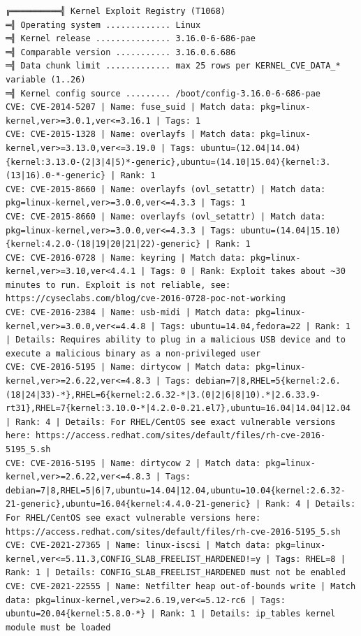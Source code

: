 \documentclass[letterpaper,11pt]{article}
\begin{document}
\begin{lstlisting}[style=salidaLinpeas]
╔══════════╣ Kernel Exploit Registry (T1068)
═╣ Operating system ............. Linux
═╣ Kernel release ............... 3.16.0-6-686-pae
═╣ Comparable version ........... 3.16.0.6.686
═╣ Data chunk limit ............. max 25 rows per KERNEL_CVE_DATA_* variable (1..26)
═╣ Kernel config source ......... /boot/config-3.16.0-6-686-pae
CVE: CVE-2014-5207 | Name: fuse_suid | Match data: pkg=linux-kernel,ver>=3.0.1,ver<=3.16.1 | Tags: 1
CVE: CVE-2015-1328 | Name: overlayfs | Match data: pkg=linux-kernel,ver>=3.13.0,ver<=3.19.0 | Tags: ubuntu=(12.04|14.04){kernel:3.13.0-(2|3|4|5)*-generic},ubuntu=(14.10|15.04){kernel:3.(13|16).0-*-generic} | Rank: 1
CVE: CVE-2015-8660 | Name: overlayfs (ovl_setattr) | Match data: pkg=linux-kernel,ver>=3.0.0,ver<=4.3.3 | Tags: 1
CVE: CVE-2015-8660 | Name: overlayfs (ovl_setattr) | Match data: pkg=linux-kernel,ver>=3.0.0,ver<=4.3.3 | Tags: ubuntu=(14.04|15.10){kernel:4.2.0-(18|19|20|21|22)-generic} | Rank: 1
CVE: CVE-2016-0728 | Name: keyring | Match data: pkg=linux-kernel,ver>=3.10,ver<4.4.1 | Tags: 0 | Rank: Exploit takes about ~30 minutes to run. Exploit is not reliable, see: https://cyseclabs.com/blog/cve-2016-0728-poc-not-working
CVE: CVE-2016-2384 | Name: usb-midi | Match data: pkg=linux-kernel,ver>=3.0.0,ver<=4.4.8 | Tags: ubuntu=14.04,fedora=22 | Rank: 1 | Details: Requires ability to plug in a malicious USB device and to execute a malicious binary as a non-privileged user
CVE: CVE-2016-5195 | Name: dirtycow | Match data: pkg=linux-kernel,ver>=2.6.22,ver<=4.8.3 | Tags: debian=7|8,RHEL=5{kernel:2.6.(18|24|33)-*},RHEL=6{kernel:2.6.32-*|3.(0|2|6|8|10).*|2.6.33.9-rt31},RHEL=7{kernel:3.10.0-*|4.2.0-0.21.el7},ubuntu=16.04|14.04|12.04 | Rank: 4 | Details: For RHEL/CentOS see exact vulnerable versions here: https://access.redhat.com/sites/default/files/rh-cve-2016-5195_5.sh
CVE: CVE-2016-5195 | Name: dirtycow 2 | Match data: pkg=linux-kernel,ver>=2.6.22,ver<=4.8.3 | Tags: debian=7|8,RHEL=5|6|7,ubuntu=14.04|12.04,ubuntu=10.04{kernel:2.6.32-21-generic},ubuntu=16.04{kernel:4.4.0-21-generic} | Rank: 4 | Details: For RHEL/CentOS see exact vulnerable versions here: https://access.redhat.com/sites/default/files/rh-cve-2016-5195_5.sh
CVE: CVE-2021-27365 | Name: linux-iscsi | Match data: pkg=linux-kernel,ver<=5.11.3,CONFIG_SLAB_FREELIST_HARDENED!=y | Tags: RHEL=8 | Rank: 1 | Details: CONFIG_SLAB_FREELIST_HARDENED must not be enabled
CVE: CVE-2021-22555 | Name: Netfilter heap out-of-bounds write | Match data: pkg=linux-kernel,ver>=2.6.19,ver<=5.12-rc6 | Tags: ubuntu=20.04{kernel:5.8.0-*} | Rank: 1 | Details: ip_tables kernel module must be loaded

\end{lstlisting}
\end{document}
